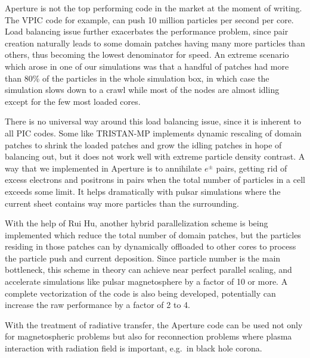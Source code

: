 Aperture is not the top performing code in the market at the moment of writing.
The VPIC code for example, can push 10 million particles per second per core.
Load balancing issue further exacerbates the performance problem, since pair
creation naturally leads to some domain patches having many more particles than
others, thus becoming the lowest denominator for speed. An extreme scenario
which arose in one of our simulations was that a handful of patches had more
than 80\% of the particles in the whole simulation box, in which case the
simulation slows down to a crawl while most of the nodes are almost idling
except for the few most loaded cores.

There is no universal way around this load balancing issue, since it is inherent
to all PIC codes. Some like TRISTAN-MP implements dynamic rescaling of domain
patches to shrink the loaded patches and grow the idling patches in hope of
balancing out, but it does not work well with extreme particle density contrast.
A way that we implemented in Aperture is to annihilate $e^{\pm}$ pairs, getting
rid of excess electrons and positrons in pairs when the total number of
particles in a cell exceeds some limit. It helps dramatically with pulsar
simulations where the current sheet contains way more particles than the
surrounding.

With the help of Rui Hu, another hybrid parallelization scheme is being
implemented which reduce the total number of domain patches, but the particles
residing in those patches can by dynamically offloaded to other cores to process
the particle push and current deposition. Since particle number is the main
bottleneck, this scheme in theory can achieve near perfect parallel scaling, and
accelerate simulations like pulsar magnetosphere by a factor of 10 or more. A
complete vectorization of the code is also being developed, potentially can
increase the raw performance by a factor of 2 to 4.

With the treatment of radiative transfer, the Aperture code can be used not only
for magnetospheric problems but also for reconnection problems where plasma
interaction with radiation field is important, e.g.\ in black hole corona.

